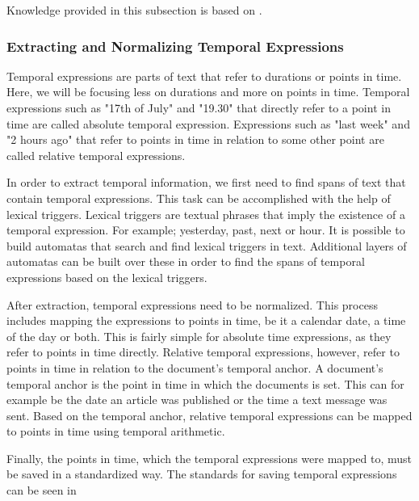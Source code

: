 Knowledge provided in this subsection is based on \parencite{nlp_ie}.

\subsubsection{Extracting and Normalizing Temporal Expressions}
Temporal expressions are parts of text that refer to durations or points in time.  
Here, we will be focusing less on durations and more on points in time.
Temporal expressions such as "17th of July" and "19.30" that directly refer to a point in time are called absolute temporal expression. 
Expressions such as "last week" and "2 hours ago" that refer to points in time in relation to some other point are called relative temporal expressions.


In order to extract temporal information, we first need to find spans of text that contain temporal expressions.
This task can be accomplished with the help of lexical triggers.
Lexical triggers are textual phrases that imply the existence of a temporal expression.
For example; yesterday, past, next or hour.
It is possible to build automatas that search and find lexical triggers in text.
Additional layers of automatas can be built over these in order to find the spans of temporal expressions based on the lexical triggers.

After extraction, temporal expressions need to be normalized.
This process includes mapping the expressions to points in time, be it a calendar date, a time of the day or both.
This is fairly simple for absolute time expressions, as they refer to points in time directly.
Relative temporal expressions, however, refer to points in time in relation to the document's temporal anchor.
A document's temporal anchor is the point in time in which the documents is set. 
This can for example be the date an article was published or the time a text message was sent.
Based on the temporal anchor, relative temporal expressions can be mapped to points in time using temporal arithmetic.

Finally, the points in time, which the temporal expressions were mapped to, must be saved in a standardized way.
The standards for saving temporal expressions can be seen in \parencite{ISO8601}

